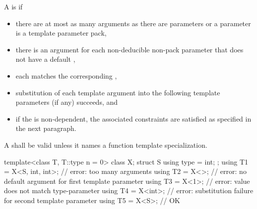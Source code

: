 \pnum
A  is  if
\begin{itemize}
\item
  there are at most as many arguments as there are parameters
  or a parameter is a template parameter pack,

\item
  there is an argument for each non-deducible non-pack parameter
  that does not have a default ,

\item
  each  matches the corresponding
  ,

\item
  substitution of each template argument into the following
  template parameters (if any) succeeds, and

\item
  if the  is non-dependent,
  the associated constraints are satisfied as specified in the next paragraph.
\end{itemize}
A  shall be valid unless it names a
function template specialization.
\begin{example}
\begin{codeblock}
template<class T, T::type n = 0> class X;
struct S {
  using type = int;
};
using T1 = X<S, int, int>;      // error: too many arguments
using T2 = X<>;                 // error: no default argument for first template parameter
using T3 = X<1>;                // error: value  does not match type-parameter
using T4 = X<int>;              // error: substitution failure for second template parameter
using T5 = X<S>;                // OK
\end{codeblock}
\end{example}

